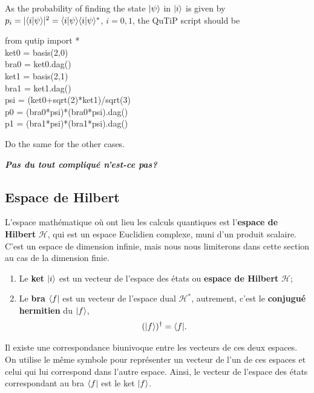 \begin{footnotesize}
\begin{solution}
\begin{enumerate}
\end{enumerate}
As the probability of finding the state $\vert\psi\rangle$ in $\vert i\rangle$ is given by 
$p_i=|\langle i\vert\psi\rangle|^2=\langle i\vert\psi\rangle\langle i\vert\psi\rangle^*$, $i=0,1$, 
the QuTiP script should be \\
\begin{tt}
from qutip import *\\
ket0 = basis(2,0)\\
bra0 = ket0.dag()\\
ket1 = basis(2,1)\\
bra1 = ket1.dag()\\
psi = (ket0+sqrt(2)*ket1)/sqrt(3) \\
p0 = (bra0*psi)*(bra0*psi).dag()\\
p1 = (bra1*psi)*(bra1*psi).dag()
\end{tt}
Do the same for the other cases.

\textbf{\emph{Pas du tout compliqué n'est-ce pas?}}
\end{solution}
\end{footnotesize}

\subsection{Espace de Hilbert}
\label{sec:EH}

L'espace mathématique où ont lieu les calculs quantiques est l'\textbf{espace de
Hilbert} $\mathcal{H}$, qui est un espace Euclidien complexe, muni d'un produit
scalaire. C'est un espace de dimension infinie, mais nous nous limiterons dans
cette section au cas de la dimension finie.
\begin{enumerate}
\item Le \textbf{ket} $\vert i\rangle$ est un vecteur de l'espace des états ou
\textbf{espace de Hilbert }$\mathcal{H}$;

\item Le \textbf{bra} $\langle f\vert$ est un vecteur de l'espace dual
$\mathcal{H}^{\ast}$, autrement, c'est le \textbf{conjugué hermitien} du
$\vert f\rangle$,
\begin{equation}
 (\vert f\rangle)^{\dag}=\langle f\vert.
\end{equation}
\end{enumerate}

Il existe une correspondance biunivoque entre les vecteurs de ces deux
espaces. On utilise le même symbole pour représenter un vecteur de l'un de ces
espaces et celui qui lui correspond dans l'autre espace. Ainsi, le vecteur de
l'espace des états correspondant au bra $\langle f\vert$ est le ket $\vert f\rangle$.

